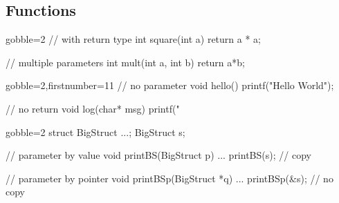 \subsection[$f()$]{Functions}

\begin{frame}[fragile]
  \begin{multicols}{2}
    \begin{cppcode*}{gobble=2}
      // with return type
      int square(int a) {
        return a * a;
      }

      // multiple parameters
      int mult(int a,
               int b) {
        return a*b;
      }
    \end{cppcode*}
    \columnbreak
    \begin{cppcode*}{gobble=2,firstnumber=11}
      // no parameter
      void hello() {
        printf("Hello World");
      }

      // no return
      void log(char* msg) {
        printf("%
      }
    \end{cppcode*}
  \end{multicols}
\end{frame}

\begin{frame}[fragile]
  \begin{multicols}{2}
    \begin{cppcode*}{gobble=2}
      struct BigStruct {...};
      BigStruct s;
      
      // parameter by value
      void printBS(BigStruct p) {
        ...
      }
      printBS(s); // copy
      
      // parameter by pointer
      void printBSp(BigStruct *q) {
        ...
      }
      printBSp(&s); // no copy
    \end{cppcode*}
    \columnbreak
    \null \vfill
    \vfill \null
  \end{multicols}
\end{frame}

